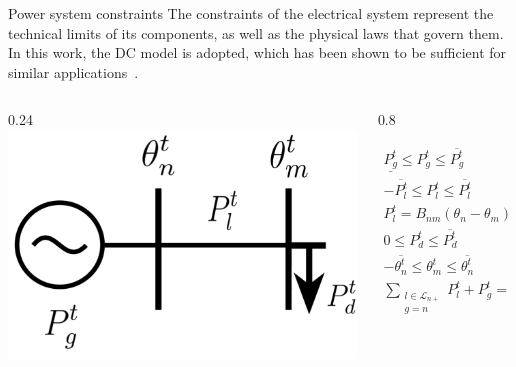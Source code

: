 \documentclass[hyperref={colorlinks,citecolor=blue,linkcolor=blue,urlcolor=blue}]{beamer}
\begin{document}
\begin{frame}{Power system constraints}
\justifying
\footnotesize
The constraints of the electrical system represent the technical limits of its components, as well as the physical laws that govern them. In this work, the DC model is adopted, which has been shown to be sufficient for similar applications~\cite{8468081}.
\begin{columns}
\begin{column}{0.24\textwidth}
\vspace{3pt}
    \includegraphics[width=1.4\textwidth]{figures/power_dummy_constraint.png}
\end{column}
\begin{column}{0.8\textwidth}  %


\begin{subequations}
\begin{alignat}{2}
    \underline{P_g^t} \leq P_{g}^t \leq \overline{P_g^t} &\quad &\forall \ g \in \mathcal{G}, \label{eq:gen_limits} \\
    -\overline{P_l^t} \leq P_{l}^t \leq \overline{P_l^t} &\quad &\forall \ l \in \mathcal{L}, \label{eq:line_limits} \\
    P_{l}^t = B_{nm}(\theta_n - \theta_{m}) &\quad &\forall \ l = (n, m) \in \mathcal{L}, \label{eq:dc_power_flow} \\
    0 \leq P_{d}^t \leq \overline{P_{d}^t} &\quad &\forall \ d \in \mathcal{D}, \label{eq:dem_limit_power} \\
    -\overline{\theta_{n}^t} \leq \theta_{m}^t \leq \overline{\theta_{n}^t} &\quad &\forall \ n \in \mathcal{N}_P, \label{eq:voltage_angle_limits} \\
    \sum_{\substack{l\in \mathcal{L}_{n+}\\g=n}}{P_{l}^t + P_{g}^t} = \sum_{\substack{l\in \mathcal{L}_{n-}\\d=n}} P_{l}^t + P_{d}^t &\quad &\forall \ n \in \mathcal{N}_P \label{eq:power_balance}
\end{alignat}
\end{subequations}
\end{column}
\end{columns}


\end{frame}
\end{document}
